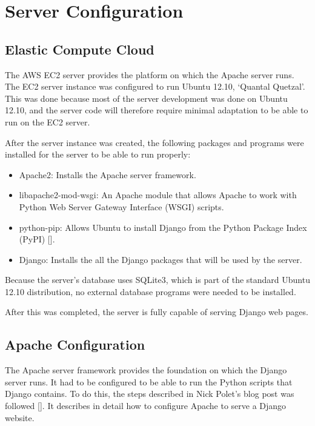 \chapter{Server Configuration}
\label{app:server-config}

\section{Elastic Compute Cloud}

The AWS EC2 server provides the platform on which the Apache
server runs. The EC2 server instance was configured to run
Ubuntu 12.10, `Quantal Quetzal'. This was done because most
of the server development was done on Ubuntu 12.10, and the
server code will therefore require minimal adaptation to be able to run on the EC2
server.

After the server instance was created, the following
packages and programs were installed for the server to be able to run properly:

\begin{itemize}
  \item Apache2: Installs the Apache server framework.
  \item libapache2-mod-wsgi: An Apache module that allows Apache to work with
  Python Web Server Gateway Interface (WSGI) scripts.
  \item python-pip: Allows Ubuntu to install Django from the Python Package Index (PyPI)
  [\cite{website:pypi}].
  \item Django: Installs the all the Django packages that will be used by the server. 
\end{itemize}

Because the server's database uses SQLite3, which is part of the standard Ubuntu
12.10 distribution, no external database programs were needed to be installed.

After this was completed, the server is fully capable of serving Django web
pages.

\section{Apache Configuration}

The Apache server framework provides the foundation on which the Django server runs. It had to
be configured to be able to run the Python scripts that Django contains. To do this, the steps
described in Nick Polet's blog post was followed [\cite{article:apache-setup}]. It describes
in detail how to configure Apache to serve a Django website.

